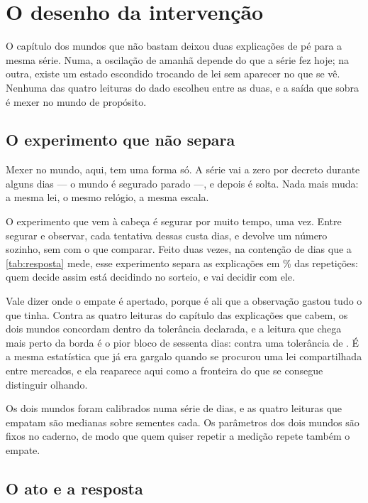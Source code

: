 \chapter{O desenho da intervenção}\label{cap:desenho}

O capítulo dos mundos que não bastam deixou duas explicações de pé para a mesma série. Numa, a oscilação de amanhã
depende do que a série fez hoje; na outra, existe um estado escondido trocando de lei sem aparecer
no que se vê. Nenhuma das quatro leituras do dado escolheu entre as duas, e a saída que sobra é
mexer no mundo de propósito.

\section{O experimento que não separa}

Mexer no mundo, aqui, tem uma forma só. A série vai a zero por decreto durante alguns dias --- o
mundo é segurado parado ---, e depois é solta. Nada mais muda: a mesma lei, o mesmo relógio, a
mesma escala.

O experimento que vem à cabeça é segurar por muito tempo, uma vez. Entre segurar e observar, cada
tentativa dessas custa \numDesenhoDiasPorReplicataMaior{} dias, e devolve um número sozinho, sem
com o que comparar. Feito duas vezes, na contenção de \numDesenhoApertadoContensao{} dias que a
\cref{tab:resposta} mede, esse experimento separa as explicações em \numDesenhoSeparaPoucasPct\%
das repetições: quem decide assim está decidindo no sorteio, e vai decidir com ele.

Vale dizer onde o empate é apertado, porque é ali que a observação gastou tudo o que tinha. Contra
as quatro leituras do capítulo das explicações que cabem, os dois mundos concordam dentro da
tolerância declarada, e
a leitura que chega mais perto da borda é o pior bloco de sessenta dias:
\numDesenhoEmpatePiorDiferenca{} contra uma tolerância de \numDesenhoEmpateToleranciaPior{}. É a
mesma estatística que já era gargalo quando se procurou uma lei compartilhada entre mercados, e ela
reaparece aqui como a fronteira do que se consegue distinguir olhando.

Os dois mundos foram calibrados numa série de \numDesenhoDiasSerie{} dias, e as quatro leituras que
empatam são medianas sobre \numDesenhoSementesEmpate{} sementes cada. Os parâmetros dos dois mundos
são fixos no caderno, de modo que quem quiser repetir a medição repete também o empate.

\section{O ato e a resposta}


